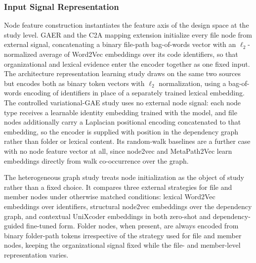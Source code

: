 \subsubsection{Input Signal Representation}

Node feature construction instantiates the feature axis of the design space at the study level. GAER and the C2A mapping extension initialize every file node from external signal, concatenating a binary file-path bag-of-words vector with an $\ell_2$-normalized average of Word2Vec embeddings over its code identifiers, so that organizational and lexical evidence enter the encoder together as one fixed input. The architecture representation learning study draws on the same two sources but encodes both as binary token vectors with $\ell_2$ normalization, using a bag-of-words encoding of identifiers in place of a separately trained lexical embedding. The controlled variational-GAE study uses no external node signal: each node type receives a learnable identity embedding trained with the model, and file nodes additionally carry a Laplacian positional encoding concatenated to that embedding, so the encoder is supplied with position in the dependency graph rather than folder or lexical content. Its random-walk baselines are a further case with no node feature vector at all, since node2vec and MetaPath2Vec learn embeddings directly from walk co-occurrence over the graph.

The heterogeneous graph study treats node initialization as the object of study rather than a fixed choice. It compares three external strategies for file and member nodes under otherwise matched conditions: lexical Word2Vec embeddings over identifiers, structural node2vec embeddings over the dependency graph, and contextual UniXcoder embeddings in both zero-shot and dependency-guided fine-tuned form. Folder nodes, when present, are always encoded from binary folder-path tokens irrespective of the strategy used for file and member nodes, keeping the organizational signal fixed while the file- and member-level representation varies.

